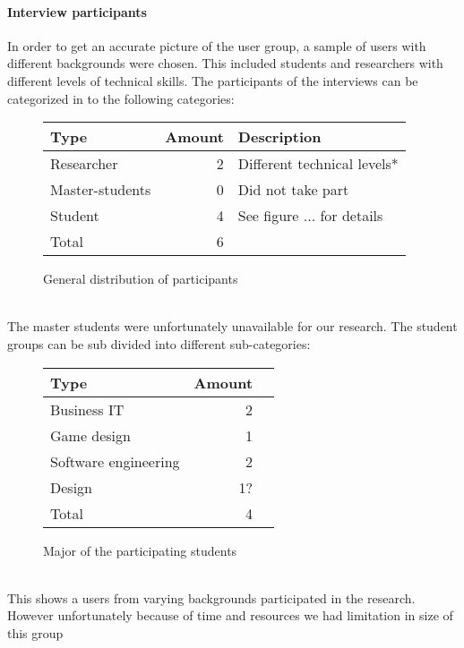 \documentclass[conference]{IEEEtran}
\begin{document}
	\paragraph{Interview participants}
		In order to get an accurate picture of the user group, a sample of users with different backgrounds were chosen. This included students and researchers with different levels of technical skills. The participants of the interviews can be categorized in to the following categories:
		\begin{figure}[ht]
			\centering
			\begin{tabular}{ | l | r | l | }
				\hline
				Type			& Amount	& Description \\ \hline \hline
				Researcher		& 2			& Different technical levels* \\ \hline
				Master-students	& 0			& Did not take part \\ \hline \hline
				Student			& 4			& See figure ... for details \\ \hline \hline
				Total			& 6			& \\ \hline
			\end{tabular}
			\caption{General distribution of participants}
		\end{figure}\\
		The master students were unfortunately unavailable for our research. The student groups can be sub divided into different sub-categories:
		\begin{figure}[ht]
			\centering
			\begin{tabular}{ | l | r | l | }
				\hline
				Type					& Amount \\ \hline \hline
				Business IT				& 2 \\ \hline
				Game design				& 1 \\ \hline
				Software engineering	& 2 \\ \hline
				Design					& 1? \\ \hline \hline
				Total					& 4 \\ \hline
			\end{tabular}
			\caption{Major of the participating students}
		\end{figure} \\
		This shows a users from varying backgrounds participated in the research. However unfortunately because of time and resources we had limitation in size of this group
\end{document}
